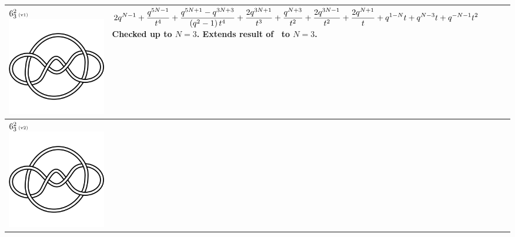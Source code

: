 \documentclass{compositio}
\theoremstyle{definition}
\numberwithin{equation}{section}
\begin{document}
{\begin{longtable}{p{}|p{}}
$6_{3}^2\,\text{{\tiny (v1)}}$ 
\includegraphics[scale=0.07,angle=0]{link6_3_2.pdf} 
& 
\newline
$
\displaystyle{%
2 q^{N-1}+\frac{q^{5 N-1}}{t^4}+\frac{q^{5 N+1}-q^{3 N+3}}{\left(q^2-1\right) t^4}+\frac{2 q^{3 N+1}}{t^3}+\frac{q^{N+3}}{t^2}+\frac{2 q^{3 N-1}}{t^2}+\frac{2 q^{N+1}}{t}+q^{1-N} t+q^{N-3} t+q^{-N-1} t^2
}
$
\newline\newline\newline
Checked up to $N=3$. Extends result of~\cite{r0508510} to $N=3$. 
\\
\hline
$6_{3}^2\,\text{{\tiny (v2)}}$ 
\includegraphics[scale=0.07,angle=0]{link6_3_2.pdf} 

\end{longtable}}
\end{document}
